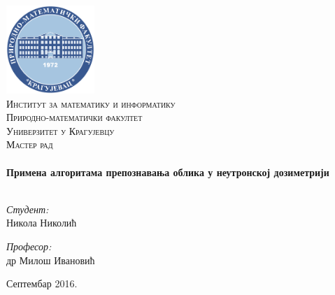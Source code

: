 %
%

\begin{titlepage}

\begin{center}

\includegraphics[width=0.25\textwidth]{logo-pmf.pdf}\\[1cm]    

\textsc{\LARGE Институт за математику и информатику
\\ Природно-математички факултет
\\ Универзитет у Крагујевцу}\\[1.5cm]

\textsc{\Large Мастер рад}\\[0.5cm]

\HRule \\[0.4cm]
{ \huge \bfseries Примена алгоритама препознавања облика у неутронској дозиметрији}\\[0.4cm]

\HRule \\[1.5cm]

\begin{minipage}{0.4\textwidth}
\begin{flushleft} \large
\emph{Студент:}\\
Никола Николић
\end{flushleft}
\end{minipage}
\begin{minipage}{0.4\textwidth}
\begin{flushright} \large
\emph{Професор:} \\
др Милош Ивановић
\end{flushright}
\end{minipage}

\vfill

{\large Септембар 2016.}

\end{center}

\end{titlepage}
